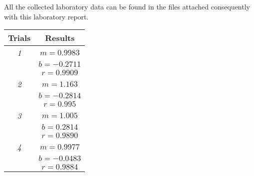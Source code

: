 

{All the collected laboratory data can be found in the files attached consequently with this laboratory report.}

\begin{table}[H]
                \centering
                \begin{tabular}{|c|c|}
                \hline
                \hline
                {Trials} & {Results} \\
                \hline
                \hline
                \textit{1} & $m = 0.9983$ \\
                 & $b = -0.2711$ \\
                 & $r = 0.9909$ \\
                \hline
                \textit{2} & $m = 1.163$ \\
                 & $b = -0.2814$ \\
                 & $r = 0.995$ \\
                \hline
                \textit{3} & $m = 1.005$ \\
                 & $b = 0.2814$ \\
                 & $r = 0.9890$ \\
                \hline
                \textit{4} & $m = 0.9977$ \\
                 & $b = -0.0483$ \\
                 & $r = 0.9884$ \\
                \hline
                \hline
                \end{tabular}
                \label{}
\end{table}

